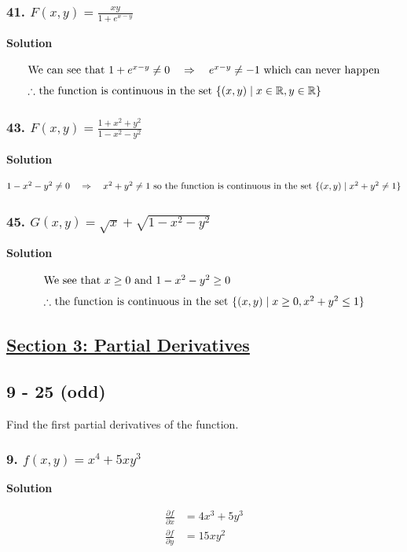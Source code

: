 \documentclass{article}
\newcommand\rr{\quad\Rightarrow\quad}
\newcommand{\such}{\; | \;}
\newcommand{\solution}{\centerline{\textbf{Solution}}}
\begin{document}
\subsubsection*{41. $F(x,y) = \displaystyle\frac{xy}{1+e^{x-y}}$}
\centerline{\textbf{Solution}}
\begin{align*}
    \intertext{We can see that $1 + e ^ {x-y} \neq 0 \rr e ^ {x-y} \neq -1$ which can never happen} 
    \intertext{$\therefore$ the function is continuous in the set $\{(x,y) \such x \in \mathbb{R}, y \in \mathbb{R}\}$}
\end{align*}
\subsubsection*{43. $F(x,y) = \displaystyle\frac{1+x^2+y^2}{1-x^2-y^2}$}
\centerline{\textbf{Solution}}
\begin{align*}
    \intertext{$1-x^2-y^2\neq 0 \rr x^2+y^2 \neq 1$ so the function is continuous in the set $\{(x,y)\such x^2+y^2\neq 1\}$}
\end{align*}
\subsubsection*{45. $G(x,y) = \sqrt x + \sqrt{1 - x^2 - y^2}$}
\centerline{\textbf{Solution}}
\begin{align*}
    \intertext{We see that $x\geq 0$ and $1-x^2-y^2\geq 0$}
    \intertext{$\therefore$ the function is continuous in the set $\{(x,y)\such x\geq 0, x^2+y^2\leq 1\}$}
\end{align*}
\newpage
\begin{center}
    \section*{\underline{Section 3: Partial Derivatives}}
\end{center}
\subsection*{9 - 25 (odd)}
Find the first partial derivatives of the function.
\subsubsection*{9. $f(x,y) = x^4 + 5xy^3$}
\solution
\begin{align*}
    \frac{\partial f}{\partial x} &= 4x^3+5y^3 \\
    \frac{\partial f}{\partial y} &= 15xy^2
\end{align*}
\end{document}
